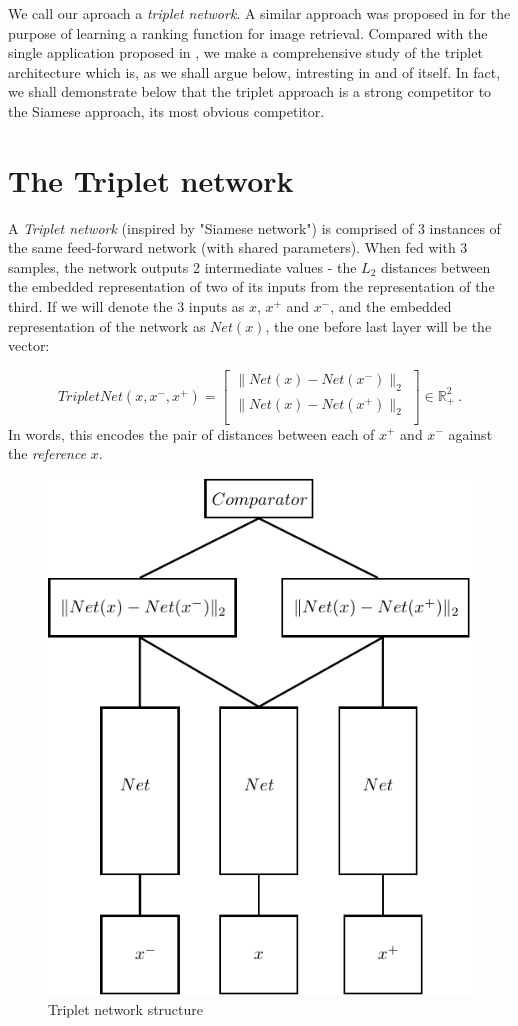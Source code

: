 \documentclass{article} %
\begin{document}
We call our aproach a \emph{triplet network}.
A similar approach  was proposed in  \cite{WangSLRWPCW2014} for the purpose of learning a ranking function for
image retrieval.  Compared with the single application proposed in  \cite{WangSLRWPCW2014}, we make a comprehensive
study of the  triplet architecture which is, as we shall argue below, intresting in and of itself.
In fact, we shall demonstrate below that the triplet approach  is a strong competitor to the Siamese approach, its
most obvious competitor.

\section{The Triplet network}
A \emph{Triplet network} (inspired by "Siamese network") is comprised of 3 instances of the same feed-forward network (with shared parameters).
When fed with 3 samples, the network
outputs 2 intermediate values - the $L_2$ distances between the embedded representation of two of its inputs from the representation of the third. 
If we will denote the 3 inputs as $x$, $x^{+}$ and $x^{-}$, and the
embedded representation of the network as $Net(x)$, the one before last layer  will be the vector:

\begin{equation*}
    TripletNet(x,x^{-},x^{+})= \begin{bmatrix}
                       \|Net(x)-Net(x^{-})\|_2 \\[0.3em]
                      \|Net(x)-Net(x^{+})\|_2 \\

                      \end{bmatrix} \in \mathbb{R}_{+}^2\ .
\end{equation*}
In words, this encodes the pair of distances between each of $x^+$ and $x^-$ against the \emph{reference} $x$.
\begin{figure}[h]
\begin{center}
\includegraphics[width=0.5\linewidth]{TripletNet_scheme.pdf}
\end{center}
   \caption{Triplet network structure }\label{tripletnet_scheme}
\end{figure}
\end{document}
